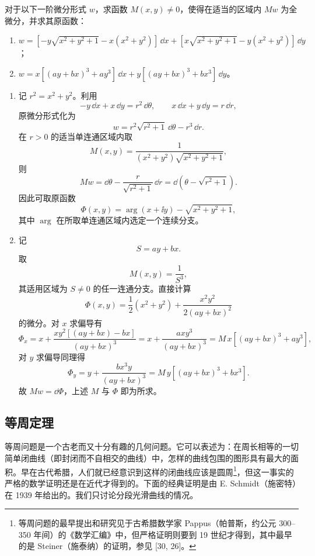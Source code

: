 \begin{xexercise}[9]
对于以下一阶微分形式 $w$，求函数 $M(x,y)\ne0$，使得在适当的区域内 $Mw$ 为全微分，并求其原函数：
\begin{enumerate}[label=(\arabic*)]
  \item $w=[-y\sqrt{x^2+y^2+1}-x(x^2+y^2)]\,\dd x+[x\sqrt{x^2+y^2+1}-y(x^2+y^2)]\,\dd y$；
  \item $w=x[(ay+bx)^3+ay^3]\,\dd x+y[(ay+bx)^3+bx^3]\,\dd y$。
\end{enumerate}
\end{xexercise}
\begin{xsolution}
\begin{enumerate}[label=(\arabic*)]
\item 记 $r^2=x^2+y^2$。利用
\[
  -y\,\dd x+x\,\dd y=r^2\,\dd\theta,
  \qquad
  x\,\dd x+y\,\dd y=r\,\dd r,
\]
原微分形式化为
\[
  w=r^2\sqrt{r^2+1}\,\dd\theta-r^3\,\dd r.
\]
在 $r>0$ 的适当单连通区域内取
\[
  M(x,y)=\frac1{(x^2+y^2)\sqrt{x^2+y^2+1}},
\]
则
\[
  Mw=\dd\theta-\frac r{\sqrt{r^2+1}}\,\dd r
  =\dd\left(\theta-\sqrt{r^2+1}\right).
\]
因此可取原函数
\[
  \Phi(x,y)=\arg(x+\ii y)-\sqrt{x^2+y^2+1},
\]
其中 $\arg$ 在所取单连通区域内选定一个连续分支。

\item 记
\[
  S=ay+bx.
\]
取
\[
  M(x,y)=\frac1{S^3},
\]
其适用区域为 $S\ne0$ 的任一连通分支。直接计算
\[
  \Phi(x,y)
  =\frac12(x^2+y^2)+\frac{x^2y^2}{2(ay+bx)^2}
\]
的微分。对 $x$ 求偏导有
\[
  \Phi_x
  =x+\frac{xy^2[(ay+bx)-bx]}{(ay+bx)^3}
  =x+\frac{axy^3}{(ay+bx)^3}
  =M\,x[(ay+bx)^3+ay^3],
\]
对 $y$ 求偏导同理得
\[
  \Phi_y
  =y+\frac{bx^3y}{(ay+bx)^3}
  =M\,y[(ay+bx)^3+bx^3].
\]
故 $Mw=\dd\Phi$，上述 $M$ 与 $\Phi$ 即为所求。
\end{enumerate}
\end{xsolution}


\subsection{等周定理}

等周问题是一个古老而又十分有趣的几何问题。它可以表述为：在周长相等的一切简单闭曲线（即封闭而不自相交的曲线）中，怎样的曲线包围的图形具有最大的面积。早在古代希腊，人们就已经意识到这样的闭曲线应该是圆周\footnote{等周问题的最早提出和研究见于古希腊数学家 Pappus（帕普斯，约公元 300--350 年间）的《数学汇编》中，但严格证明则要到 19 世纪才得到，其中最早的是 Steiner（施泰纳）的证明，参见 [30, 26]。}，但这一事实的严格的数学证明还是在近代才得到的。下面的经典证明是由 E. Schmidt（施密特）在 1939 年给出的。我们只讨论分段光滑曲线的情况。

